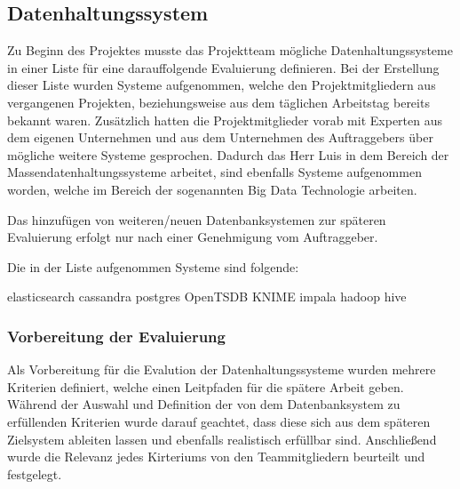 \subsection{Datenhaltungssystem}
\label{subsec:datenhaltungssystem}
Zu Beginn des Projektes musste das Projektteam mögliche Datenhaltungssysteme in
einer Liste für eine darauffolgende Evaluierung definieren. Bei der Erstellung
dieser Liste wurden Systeme aufgenommen, welche den Projektmitgliedern aus
vergangenen Projekten, beziehungsweise aus dem täglichen Arbeitstag bereits
bekannt waren. Zusätzlich hatten die Projektmitglieder vorab mit Experten aus
dem eigenen Unternehmen und aus dem Unternehmen des Auftraggebers über mögliche
weitere Systeme gesprochen.  Dadurch das Herr Luis in dem Bereich der
Massendatenhaltungssysteme arbeitet, sind ebenfalls Systeme aufgenommen worden,
welche im Bereich der sogenannten Big Data Technologie arbeiten.

Das hinzufügen von weiteren/neuen Datenbanksystemen zur späteren
Evaluierung erfolgt nur nach einer Genehmigung vom Auftraggeber.

Die in der Liste aufgenommen Systeme sind folgende:

\begin{outline}
  \1 elasticsearch
  \1 cassandra
  \1 postgres
  \1 OpenTSDB
  \1 KNIME
  \1 impala
  \1 hadoop
  \1 hive
\end{outline}
\nl%

\subsubsection{Vorbereitung der Evaluierung}
\label{subsubsec:DBS_vorbereitung_der_evaluierung}
Als Vorbereitung für die Evalution der Datenhaltungssysteme wurden mehrere
Kriterien definiert, welche einen Leitpfaden für die spätere Arbeit geben.
Während der Auswahl und Definition der von dem Datenbanksystem zu erfüllenden
Kriterien wurde darauf geachtet, dass diese sich aus dem späteren Zielsystem
ableiten lassen und ebenfalls realistisch erfüllbar sind. Anschließend wurde
die Relevanz jedes Kirteriums von den Teammitgliedern beurteilt und festgelegt.

